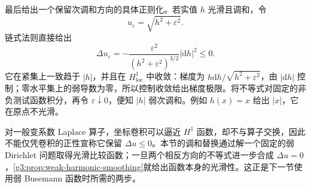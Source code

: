 最后给出一个保留次调和方向的具体正则化。若实值 \(h\) 光滑且调和，令
\[
	u_\varepsilon=\sqrt{h^2+\varepsilon^2}.
\]
链式法则直接给出
\[
	\Delta u_\varepsilon
	=-\frac{\varepsilon^2}{(h^2+\varepsilon^2)^{3/2}}|\mathrm dh|^2\le0.
\]
它在紧集上一致趋于 \(|h|\)，并且在 \(H^1_{\mathrm{loc}}\) 中收敛：梯度为 \(h\mathrm dh/\sqrt{h^2+\varepsilon^2}\)，由 \(|\mathrm dh|\) 控制；零水平集上的弱导数为零，所以控制收敛给出梯度极限。将不等式对固定的非负测试函数积分，再令 \(\varepsilon\downarrow0\)，便知 \(|h|\) 弱次调和。例如 \(h(x)=x\) 给出 \(|x|\)，它在原点不光滑。

\ProseParagraphBreak

对一般变系数 Laplace 算子，坐标卷积可以逼近 \(H^1\) 函数，却不与算子交换，因此不能仅凭卷积的正性宣称它保留 \(\Delta u\le0\)。本节的调和替换通过解一个固定的弱 Dirichlet 问题取得光滑比较函数；一旦两个相反方向的不等式进一步合成 \(\Delta u=0\)，\cref{g3:prop:weak-harmonic-smoothing}就给出函数本身的光滑性。这正是下一节使用弱 Busemann 函数时所需的两步。
